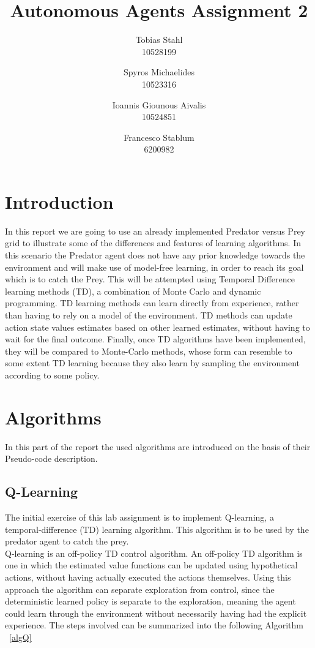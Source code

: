 \documentclass[11pt]{article}
\title{
	\textbf{Autonomous Agents Assignment 2}
}
\author{Tobias Stahl \\ 10528199 \and Spyros Michaelides \\ 10523316 \and Ioannis Giounous Aivalis \\ 10524851 \and Francesco Stablum \\ 6200982}
\begin{document}
\maketitle


\section{Introduction}
In this report we are going to use an already implemented Predator versus Prey grid to illustrate some of the differences and features of learning algorithms. In this scenario the Predator agent does not have any prior knowledge towards the environment and will make use of model-free learning, in order to reach its goal which is to catch the Prey. This will be attempted  using Temporal Difference learning methods (TD), a combination of Monte Carlo and dynamic programming. TD learning methods can learn directly from experience, rather than having to rely on a model of the environment. TD methods can update action state values estimates based on other learned estimates, without having to wait for the final outcome. Finally, once TD algorithms have been implemented, they will be compared to Monte-Carlo methods, whose form can resemble to some extent TD learning because they also learn by sampling the environment according to some policy. 

\section{Algorithms}
In this part of the report the used algorithms are introduced on the basis of their Pseudo-code description.


\subsection{Q-Learning}
The initial exercise of this lab assignment is to implement Q-learning, a temporal-difference (TD) learning algorithm. This algorithm is to be used by the predator agent to catch the prey.\\
Q-learning is an off-policy TD control algorithm. An off-policy TD algorithm is one in which the estimated value functions can be updated using hypothetical actions, without having actually executed the actions themselves. Using this approach the algorithm can separate exploration from control, since the deterministic learned policy is separate to the exploration, meaning the agent could learn through the environment without necessarily having had the explicit experience.
The steps involved can be summarized into the following Algorithm ~\ref{algQ}\\\\
\end{document}
